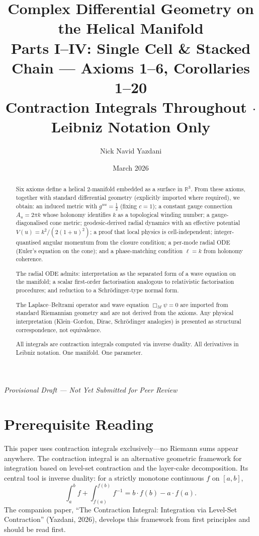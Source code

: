 \documentclass[12pt]{amsart}
\title{Complex Differential Geometry on the Helical Manifold\\
Parts I--IV: Single Cell \& Stacked Chain --- Axioms 1--6, Corollaries 1--20\\
Contraction Integrals Throughout $\cdot$ Leibniz Notation Only}
\author{Nick Navid Yazdani}
\date{March 2026}
\begin{document}
\maketitle

\begin{center}
\textit{Provisional Draft --- Not Yet Submitted for Peer Review}
\end{center}

\section*{Prerequisite Reading}

This paper uses contraction integrals exclusively---no Riemann sums appear anywhere. The
contraction integral is an alternative geometric framework for integration based on level-set
contraction and the layer-cake decomposition. Its central tool is inverse duality: for a strictly
monotone continuous $f$ on $[a,b]$,
\[
  \int_a^b f + \int_{f(a)}^{f(b)} f^{-1} = b \cdot f(b) - a \cdot f(a).
\]
The companion paper, ``The Contraction Integral: Integration via Level-Set Contraction''
(Yazdani, 2026), develops this framework from first principles and should be read first.

\begin{abstract}
Six axioms define a helical 2-manifold embedded as a surface in $\mathbb{R}^3$. From these
axioms, together with standard differential geometry (explicitly imported where required), we
obtain: an induced metric with $g^{uu} = \tfrac{1}{2}$ (fixing $c = 1$); a constant gauge
connection $A_u = 2\pi k$ whose holonomy identifies $k$ as a topological winding number; a
gauge-diagonalised cone metric; geodesic-derived radial dynamics with an effective potential
$V(u) = k^2/(2(1+u)^2)$; a proof that local physics is cell-independent; integer-quantised
angular momentum from the closure condition; a per-mode radial ODE (Euler's equation on the
cone); and a phase-matching condition $\ell = k$ from holonomy coherence.

The radial ODE admits: interpretation as the separated form of a wave equation on the
manifold; a scalar first-order factorisation analogous to relativistic factorisation procedures;
and reduction to a Schr\"odinger-type normal form.

The Laplace--Beltrami operator and wave equation $\Box_M \psi = 0$ are imported from standard
Riemannian geometry and are not derived from the axioms. Any physical interpretation
(Klein--Gordon, Dirac, Schr\"odinger analogies) is presented as structural correspondence,
not equivalence.

All integrals are contraction integrals computed via inverse duality. All derivatives in Leibniz
notation. One manifold. One parameter.
\end{abstract}
\end{document}
